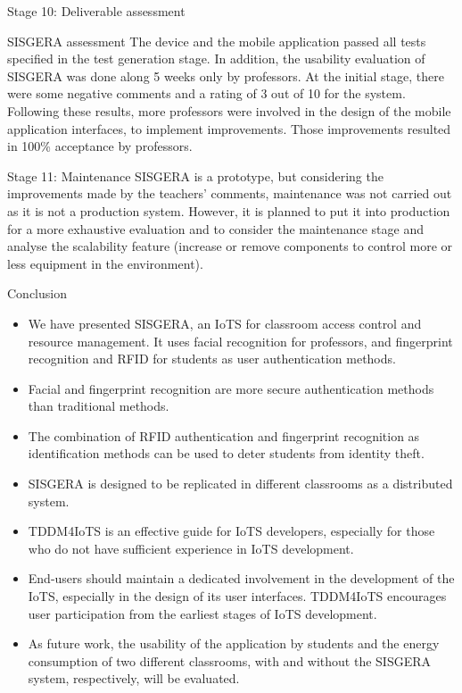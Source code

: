 \documentclass[notes=show, 10pt]{beamer}
\begin{document}
    \begin{frame}{Stage 10: Deliverable assessment}
        \begin{block}{SISGERA assessment}
            The device and the mobile application passed all tests specified in the test generation stage. In addition, the usability evaluation of SISGERA was done along 5 weeks only by professors. At the initial stage, there were some negative comments and a rating of 3 out of 10 for the system. Following these results, more professors were involved in the design of the mobile application interfaces, to implement improvements. Those improvements resulted in 100\% acceptance by professors.
        \end{block}
        \begin{block}{Stage 11: Maintenance}
            SISGERA is a prototype, but considering the improvements made by the teachers' comments, maintenance was not carried out as it is not a production system. However, it is planned to put it into production for a more exhaustive evaluation and to consider the maintenance stage and analyse the scalability feature (increase or remove components to control more or less equipment in the environment).
        \end{block}
    \end{frame}
    
    \begin{frame}{Conclusion}
            \begin{itemize}
                \item We have presented SISGERA, an IoTS for classroom access control and resource management. It uses facial recognition for professors, and fingerprint recognition and RFID for students as user authentication methods.
                \item Facial and fingerprint recognition are more secure authentication methods than traditional methods.
                \item The combination of RFID authentication and fingerprint recognition as identification methods can be used to deter students from identity theft.
                \item SISGERA is designed to be replicated in different classrooms as a distributed system.
                \item TDDM4IoTS is an effective guide for IoTS developers, especially for those who do not have sufficient experience in IoTS development.
                \item End-users should maintain a dedicated involvement in the development of the IoTS, especially in the design of its user interfaces.
                TDDM4IoTS encourages user participation from the earliest stages of IoTS development.
                \item As future work, the usability of the application by students and the energy consumption of two different classrooms, with and without the SISGERA system, respectively, will be evaluated.
            \end{itemize}
    \end{frame}
\end{document}
